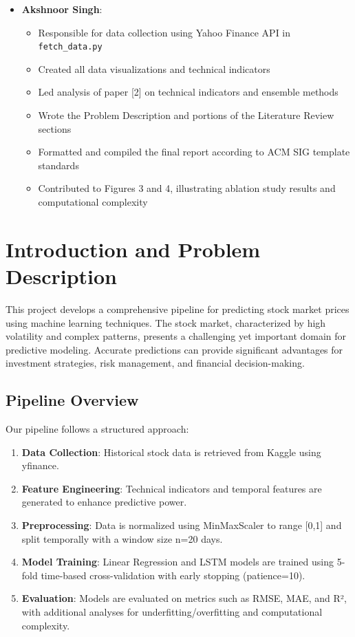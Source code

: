 \documentclass[sigconf]{acmart}
\begin{document}
\begin{itemize}
\item \textbf{Akshnoor Singh}: 
  \begin{itemize}
    \item Responsible for data collection using Yahoo Finance API in \texttt{fetch\_data.py}
    \item Created all data visualizations and technical indicators
    \item Led analysis of paper [2] on technical indicators and ensemble methods
    \item Wrote the Problem Description and portions of the Literature Review sections
    \item Formatted and compiled the final report according to ACM SIG template standards
    \item Contributed to Figures 3 and 4, illustrating ablation study results and computational complexity
  \end{itemize}
\end{itemize}

\section{Introduction and Problem Description}

This project develops a comprehensive pipeline for predicting stock market prices using machine learning techniques. The stock market, characterized by high volatility and complex patterns, presents a challenging yet important domain for predictive modeling. Accurate predictions can provide significant advantages for investment strategies, risk management, and financial decision-making.

\subsection{Pipeline Overview}

Our pipeline follows a structured approach:
\begin{enumerate}
\item \textbf{Data Collection}: Historical stock data is retrieved from Kaggle using yfinance.
\item \textbf{Feature Engineering}: Technical indicators and temporal features are generated to enhance predictive power.
\item \textbf{Preprocessing}: Data is normalized using MinMaxScaler to range [0,1] and split temporally with a window size n=20 days.
\item \textbf{Model Training}: Linear Regression and LSTM models are trained using 5-fold time-based cross-validation with early stopping (patience=10).
\item \textbf{Evaluation}: Models are evaluated on metrics such as RMSE, MAE, and R², with additional analyses for underfitting/overfitting and computational complexity.
\end{enumerate}
\end{document}
